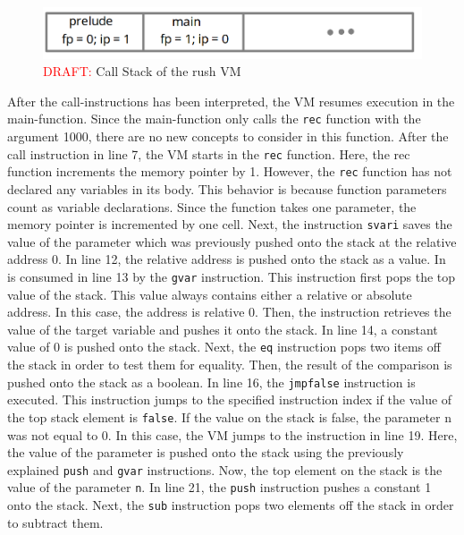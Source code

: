 \begin{figure}[h]
	\includegraphics[width=\textwidth]{./vm_call_stack_draft.png}
	\caption{\textcolor{red}{DRAFT:} Call Stack of the rush VM}
	\label{fig:rush_vm_call_stack}
\end{figure}

After the call-instructions has been interpreted, the VM resumes execution in the main-function.
Since the main-function only calls the \texttt{rec} function with the argument 1000, there are no new concepts to consider in this function.
After the call instruction in line 7, the VM starts in the \texttt{rec} function.
Here, the rec function increments the memory pointer by 1.
However, the \texttt{rec} function has not declared any variables in its body.
This behavior is because function parameters count as variable declarations.
Since the function takes one parameter, the memory pointer is incremented by one cell.
Next, the instruction \texttt{svari} saves the value of the parameter which was previously pushed onto the stack at the relative address 0.
In line 12, the relative address is pushed onto the stack as a value.
In is consumed in line 13 by the \texttt{gvar} instruction.
This instruction first pops the top value of the stack.
This value always contains either a relative or absolute address.
In this case, the address is relative 0.
Then, the instruction retrieves the value of the target variable and pushes it onto the stack.
In line 14, a constant value of 0 is pushed onto the stack.
Next, the \texttt{eq} instruction pops two items off the stack in order to test them for equality.
Then, the result of the comparison is pushed onto the stack as a boolean.
In line 16, the \texttt{jmpfalse} instruction is executed.
This instruction jumps to the specified instruction index if the value of the top stack element is \texttt{false}.
If the value on the stack is false, the parameter n was not equal to 0.
In this case, the VM jumps to the instruction in line 19.
Here, the value of the parameter is pushed onto the stack using the previously explained \texttt{push} and \texttt{gvar} instructions.
Now, the top element on the stack is the value of the parameter \texttt{n}.
In line 21, the \texttt{push} instruction pushes a constant 1 onto the stack.
Next, the \texttt{sub} instruction pops two elements off the stack in order to subtract them.
